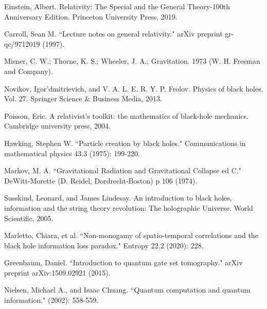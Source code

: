 \documentclass[fleqn,usenatbib]{mnras}
\begin{document}


\begin{thebibliography}{99}

Einstein, Albert. Relativity: The Special and the General Theory-100th Anniversary Edition. Princeton University Press, 2019.

Carroll, Sean M. ``Lecture notes on general relativity." arXiv preprint gr-qc/9712019 (1997).

Misner, C. W.; Thorne, K. S.; Wheeler, J. A.; Gravitation. 1973 (W. H. Freeman and Company).

Novikov, Igor'dmitrievich, and V. A. L. E. R. Y. P. Frolov. Physics of black holes. Vol. 27. Springer Science \& Business Media, 2013.

Poisson, Eric. A relativist's toolkit: the mathematics of black-hole mechanics. Cambridge university press, 2004.

Hawking, Stephen W. ``Particle creation by black holes." Communications in mathematical physics 43.3 (1975): 199-220.

Markov, M. A. ``Gravitational Radiation and Gravitational Collapse ed C." DeWitt-Morette (D. Reidel, Dordrecht-Boston) p 106 (1974).

Susskind, Leonard, and James Lindesay. An introduction to black holes, information and the string theory revolution: The holographic Universe. World Scientific, 2005.

Marletto, Chiara, et al. ``Non-monogamy of spatio-temporal correlations and the black hole information loss paradox." Entropy 22.2 (2020): 228.

Greenbaum, Daniel. ``Introduction to quantum gate set tomography." arXiv preprint arXiv:1509.02921 (2015).

Nielsen, Michael A., and Isaac Chuang. ``Quantum computation and quantum information." (2002): 558-559.


\end{thebibliography}
\end{document}
